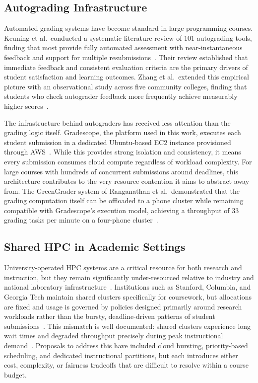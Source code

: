 \documentclass[acmlarge]{acmart}
\begin{document}
\subsection{Autograding Infrastructure}
 
Automated grading systems have become standard in large programming
courses. Keuning et al.\ conducted a systematic literature review of
101 autograding tools, finding that most provide fully automated
assessment with near-instantaneous feedback and support for multiple
resubmissions~\cite{keuning2018}. Their review established that
immediate feedback and consistent evaluation criteria are the primary
drivers of student satisfaction and learning outcomes. Zhang et al.\
extended this empirical picture with an observational study across five
community colleges, finding that students who check autograder feedback
more frequently achieve measurably higher scores~\cite{tran2025}.
 
The infrastructure behind autograders has received less attention than
the grading logic itself. Gradescope, the platform used in this work,
executes each student submission in a dedicated Ubuntu-based EC2
instance provisioned through AWS~\cite{ranganathan2025junkyard}. While
this provides strong isolation and consistency, it means every
submission consumes cloud compute regardless of workload complexity.
For large courses with hundreds of concurrent submissions around
deadlines, this architecture contributes to the very resource
contention it aims to abstract away from. The GreenGrader system of
Ranganathan et al.\ demonstrated that the grading computation itself
can be offloaded to a phone cluster while remaining compatible with
Gradescope's execution model, achieving a throughput of 33 grading
tasks per minute on a four-phone cluster~\cite{ranganathan2025junkyard}.
 
\subsection{Shared HPC in Academic Settings}
 
University-operated HPC systems are a critical resource for both
research and instruction, but they remain significantly
under-resourced relative to industry and national laboratory
infrastructure~\cite{hpcsurvey2025}. Institutions such as Stanford,
Columbia, and Georgia Tech maintain shared clusters specifically for
coursework, but allocations are fixed and usage is governed by
policies designed primarily around research workloads rather than the
bursty, deadline-driven patterns of student
submissions~\cite{hpcsurvey2025}. This mismatch is well documented: shared
clusters experience long wait times and degraded throughput precisely
during peak instructional demand~\cite{hpcsurvey2025}. Proposals to
address this have included cloud bursting, priority-based scheduling,
and dedicated instructional partitions, but each introduces either
cost, complexity, or fairness tradeoffs that are difficult to resolve
within a course budget.
 
\end{document}
